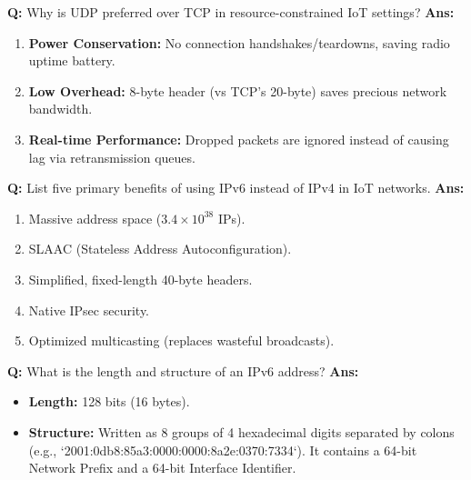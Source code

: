 \documentclass[10pt,a4paper,twocolumn]{article}
\begin{document}
\begin{tcolorbox}[
  colback=white,
  colframe=UnitColorThree,
  colbacktitle=gray!10!white,
  coltitle=black,
  fonttitle=\bfseries\sffamily\small,
  title={Unit III $\bullet$ Card 7},
  boxrule=1.2pt,
  arc=2mm,
  outer arc=2mm,
  boxsep=1.5mm,
  top=1mm,
  bottom=1mm,
  left=1.5mm,
  right=1.5mm,
  before skip=2.5mm,
  after skip=2.5mm
]
\textbf{Q:} Why is UDP preferred over TCP in resource-constrained IoT settings?
\tcbline
\textbf{Ans:} \begin{enumerate}
  \item \textbf{Power Conservation:} No connection handshakes/teardowns, saving radio uptime battery.
  \item \textbf{Low Overhead:} 8-byte header (vs TCP's 20-byte) saves precious network bandwidth.
  \item \textbf{Real-time Performance:} Dropped packets are ignored instead of causing lag via retransmission queues.
\end{enumerate}
\end{tcolorbox}


\begin{tcolorbox}[
  colback=white,
  colframe=UnitColorThree,
  colbacktitle=gray!10!white,
  coltitle=black,
  fonttitle=\bfseries\sffamily\small,
  title={Unit III $\bullet$ Card 8},
  boxrule=1.2pt,
  arc=2mm,
  outer arc=2mm,
  boxsep=1.5mm,
  top=1mm,
  bottom=1mm,
  left=1.5mm,
  right=1.5mm,
  before skip=2.5mm,
  after skip=2.5mm
]
\textbf{Q:} List five primary benefits of using IPv6 instead of IPv4 in IoT networks.
\tcbline
\textbf{Ans:} \begin{enumerate}
  \item Massive address space ($3.4 \times 10^{38}$ IPs).
  \item SLAAC (Stateless Address Autoconfiguration).
  \item Simplified, fixed-length 40-byte headers.
  \item Native IPsec security.
  \item Optimized multicasting (replaces wasteful broadcasts).
\end{enumerate}
\end{tcolorbox}


\begin{tcolorbox}[
  colback=white,
  colframe=UnitColorThree,
  colbacktitle=gray!10!white,
  coltitle=black,
  fonttitle=\bfseries\sffamily\small,
  title={Unit III $\bullet$ Card 9},
  boxrule=1.2pt,
  arc=2mm,
  outer arc=2mm,
  boxsep=1.5mm,
  top=1mm,
  bottom=1mm,
  left=1.5mm,
  right=1.5mm,
  before skip=2.5mm,
  after skip=2.5mm
]
\textbf{Q:} What is the length and structure of an IPv6 address?
\tcbline
\textbf{Ans:} \begin{itemize}
  \item \textbf{Length:} 128 bits (16 bytes).
  \item \textbf{Structure:} Written as 8 groups of 4 hexadecimal digits separated by colons (e.g., `2001:0db8:85a3:0000:0000:8a2e:0370:7334`). It contains a 64-bit Network Prefix and a 64-bit Interface Identifier.
\end{itemize}
\end{tcolorbox}
\end{document}
